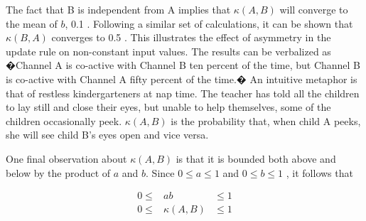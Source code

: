 The fact that B is independent from A implies that $\kappa(A, B)$ will converge to the mean of $b$, 0.1 . Following a similar set of calculations, it can be shown that $\kappa(B, A)$ converges to 0.5 . This illustrates the effect of asymmetry in the update rule on non-constant input values. The results can be verbalized as �Channel A is co-active with Channel B ten percent of the time, but Channel B is co-active with Channel A fifty percent of the time.� An intuitive metaphor is that of restless kindergarteners at nap time. The teacher has told all the children to lay still and close their eyes, but unable to help themselves, some of the children occasionally peek. $\kappa(A, B)$ is the probability that, when child A peeks, she will see child B's eyes open and vice versa.

One final observation about $\kappa(A, B)$ is that it is bounded both above and below by the product of $a$ and $b$. Since $0 \leq a \leq 1$ and $0 \leq b \leq 1$ ,  it follows that 

\begin{eqnarray}
0 \leq&ab&  \leq 1 \\
0 \leq&\kappa(A, B)&  \leq 1 
\end{eqnarray}
